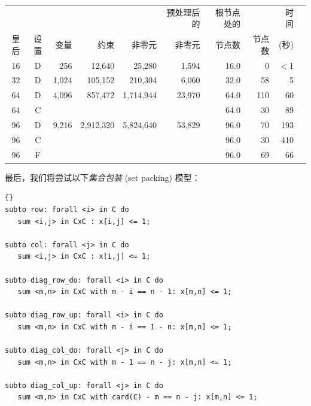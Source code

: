 \begin{center}
{\sffamily\small
\begin{tabular}{ccrrrrrrrr}
\toprule
       &   &      &      &        & 预处理后的 & 根节点处的 &       & 时间 \\
皇后 & 设置 & 变量 &      约束 & 非零元 & 非零元 & 节点数 & 节点数 & (秒) \\
\midrule
  16   & D &   256 &    12,640 &    25,280 &  1,594 & 16.0 &       0 & $<$1\\
  32   & D & 1,024 &   105,152 &   210,304 &  6,060 & 32.0 &      58 & 5  \\
  64   & D & 4,096 &   857,472 & 1,714,944 & 23,970 & 64.0 &     110 & 60\\
  64   & C &       &           &           &        & 64.0 &      30 & 89\\
  96   & D & 9,216 & 2,912,320 & 5,824,640 & 53,829 & 96.0 &      70 & 193\\
  96   & C &       &           &           &        & 96.0 &      30 & 410\\
  96   & F &       &           &           &        & 96.0 &      69 & 66\\
\bottomrule
\end{tabular}
}
\end{center}

最后，我们将尝试以下\emph{集合包装} (set packing) 模型：

\medskip
\begin{lstlisting}[frame=tb,firstnumber=13]{}
subto row: forall <i> in C do
   sum <i,j> in CxC : x[i,j] <= 1;

subto col: forall <j> in C do
   sum <i,j> in CxC : x[i,j] <= 1;

subto diag_row_do: forall <i> in C do
   sum <m,n> in CxC with m - i == n - 1: x[m,n] <= 1;

subto diag_row_up: forall <i> in C do
   sum <m,n> in CxC with m - i == 1 - n: x[m,n] <= 1;

subto diag_col_do: forall <j> in C do
   sum <m,n> in CxC with m - 1 == n - j: x[m,n] <= 1;

subto diag_col_up: forall <j> in C do
   sum <m,n> in CxC with card(C) - m == n - j: x[m,n] <= 1;
\end{lstlisting}


